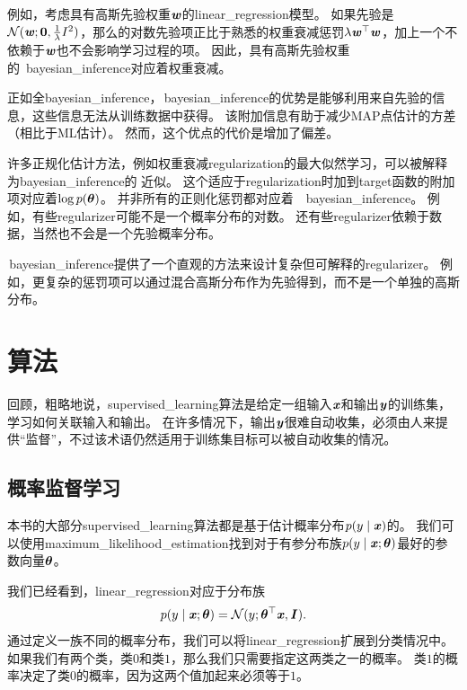 
例如，考虑具有高斯先验权重$\boldsymbol{\mathit{w}}$的\gls{linear_regression}模型。
如果先验是$\mathcal{N}(\boldsymbol{\mathit{w}};\mathbf{0},\frac{1}{\lambda}I^2)$，那么的对数先验项正比于熟悉的权重衰减惩罚$\lambda \boldsymbol{\mathit{w}}^\top\boldsymbol{\mathit{w}}$，加上一个不依赖于$\boldsymbol{\mathit{w}}$也不会影响学习过程的项。
因此，具有高斯先验权重的~\gls{bayesian_inference}对应着权重衰减。

正如全\gls{bayesian_inference}，\,\gls{bayesian_inference}的优势是能够利用来自先验的信息，这些信息无法从训练数据中获得。
该附加信息有助于减少\gls{MAP}点估计的方差（相比于ML估计）。
然而，这个优点的代价是增加了偏差。

许多正规化估计方法，例如权重衰减\gls{regularization}的最大似然学习，可以被解释为\gls{bayesian_inference}的\,\,近似。
这个适应于\gls{regularization}时加到\gls{target}函数的附加项对应着$\log p(\boldsymbol{\theta})$。
并非所有的正则化惩罚都对应着~~\gls{bayesian_inference}。
例如，有些\gls{regularizer}可能不是一个概率分布的对数。
还有些\gls{regularizer}依赖于数据，当然也不会是一个先验概率分布。

\,\gls{bayesian_inference}提供了一个直观的方法来设计复杂但可解释的\gls{regularizer}。
例如，更复杂的惩罚项可以通过混合高斯分布作为先验得到，而不是一个单独的高斯分布\citep{Nowlan-nips92}。

\section{算法}
\label{sec:supervised_learning_algorithms}
回顾，粗略地说，\gls{supervised_learning}算法是给定一组输入$\boldsymbol{\mathit{x}}$和输出$\boldsymbol{\mathit{y}}$的训练集，学习如何关联输入和输出。
在许多情况下，输出$\boldsymbol{\mathit{y}}$很难自动收集，必须由人来提供``监督''，不过该术语仍然适用于训练集目标可以被自动收集的情况。


\subsection{概率监督学习}
\label{sec:probabilistic_supervised_learning}
本书的大部分\gls{supervised_learning}算法都是基于估计概率分布$p(y\mid\boldsymbol{\mathit{x}})$的。
我们可以使用\gls{maximum_likelihood_estimation}找到对于有参分布族$p(y\mid\boldsymbol{\mathit{x}};\boldsymbol{\theta})$最好的参数向量$\boldsymbol{\theta}$。 

我们已经看到，\gls{linear_regression}对应于分布族
\begin{equation}
    p(y \mid \boldsymbol{\mathit{x}}; \boldsymbol{\theta}) = \mathcal{N}( y; \boldsymbol{\theta}^\top \boldsymbol{\mathit{x}}, \boldsymbol{\mathit{I}}).
\end{equation}
通过定义一族不同的概率分布，我们可以将\gls{linear_regression}扩展到分类情况中。
如果我们有两个类，类$0$和类$1$，那么我们只需要指定这两类之一的概率。
类$1$的概率决定了类$0$的概率，因为这两个值加起来必须等于$1$。

